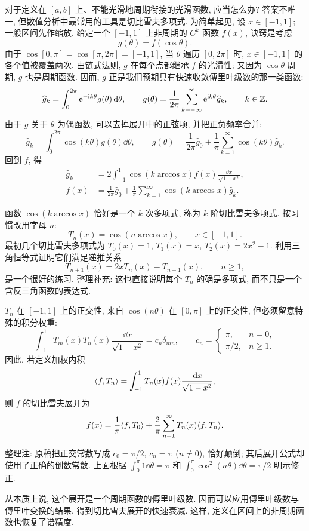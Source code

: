 对于定义在 $[a,b]$ 上、不能光滑地周期衔接的光滑函数, 应当怎么办? 答案不唯一, 但数值分析中最常用的工具是切比雪夫多项式. 为简单起见, 设 $x\in[-1,1]$; 一般区间先作缩放. 给定一个 $[-1,1]$ 上非周期的 $C^k$ 函数 $f(x)$, 诀窍是考虑
\[
g(\theta)=f(\cos\theta).
\]
由于 $\cos[0,\pi]=\cos[\pi,2\pi]=[-1,1]$, 当 $\theta$ 遍历 $[0,2\pi]$ 时, $x\in[-1,1]$ 的各个值被覆盖两次. 由链式法则, $g$ 在每个点都继承 $f$ 的光滑性; 又因为 $\cos\theta$ 周期, $g$ 也是周期函数. 因而, $g$ 正是我们预期具有快速收敛傅里叶级数的那一类函数:
\[
\widehat g_k=\int_0^{2\pi}\mathrm e^{-\mathrm i k\theta}g(\theta)\,\mathrm d\theta,
\qquad
g(\theta)=\frac1{2\pi}\sum_{k=-\infty}^{\infty}
\mathrm e^{\mathrm i k\theta}\widehat g_k,\qquad k\in\mathbb Z.
\]
由于 $g$ 关于 $\theta$ 为偶函数, 可以去掉展开中的正弦项, 并把正负频率合并:
\[
\widehat g_k=\int_0^{2\pi}\cos(k\theta)g(\theta)\dd\theta,
\qquad
g(\theta)=\frac1{2\pi}\widehat g_0
+\frac1\pi\sum_{k=1}^{\infty}\cos(k\theta)\widehat g_k.
\]
回到 $f$, 得
\begin{align*}
\widehat g_k&=2\int_{-1}^{1}\cos(k\arccos x)f(x)
\frac{\dd x}{\sqrt{1-x^2}},\\
f(x)&=\frac1{2\pi}\widehat g_0
+\frac1\pi\sum_{k=1}^{\infty}\cos(k\arccos x)\widehat g_k.
\end{align*}

函数 $\cos(k\arccos x)$ 恰好是一个 $k$ 次多项式, 称为 $k$ 阶切比雪夫多项式. 按习惯改用字母 $n$:
\[
T_n(x)=\cos(n\arccos x),\qquad x\in[-1,1].
\]
最初几个切比雪夫多项式为 $T_0(x)=1$, $T_1(x)=x$, $T_2(x)=2x^2-1$. 利用三角恒等式证明它们满足递推关系
\[
T_{n+1}(x)=2xT_n(x)-T_{n-1}(x),\qquad n\ge1,
\]
是一个很好的练习. 整理补充: 这也直接说明每个 $T_n$ 的确是多项式, 而不只是一个含反三角函数的表达式.

$T_n$ 在 $[-1,1]$ 上的正交性, 来自 $\cos(n\theta)$ 在 $[0,\pi]$ 上的正交性, 但必须留意特殊的积分权重:
\[
\int_{-1}^{1}T_m(x)T_n(x)\frac{\dd x}{\sqrt{1-x^2}}
=c_n\delta_{mn},\qquad
c_n=\begin{cases}\pi,&n=0,\\\pi/2,&n\ge1.\end{cases}
\]
因此, 若定义加权内积
\[
\langle f,T_n\rangle=\int_{-1}^{1}T_n(x)f(x)\frac{\,\mathrm d x}{\sqrt{1-x^2}},
\]
则 $f$ 的切比雪夫展开为
\[
f(x)=\frac1\pi\langle f,T_0\rangle
+\frac2\pi\sum_{n=1}^{\infty}T_n(x)\langle f,T_n\rangle.
\]
\begin{remark}
整理注: 原稿把正交常数写成 $c_0=\pi/2$, $c_n=\pi$ ($n\ne0$), 恰好颠倒; 其后展开公式却使用了正确的倒数常数. 上面根据 $\int_0^\pi1\dd\theta=\pi$ 和 $\int_0^\pi\cos^2(n\theta)\dd\theta=\pi/2$ 明示修正.
\end{remark}

从本质上说, 这个展开是一个周期函数的傅里叶级数. 因而可以应用傅里叶级数与傅里叶变换的结果, 得到切比雪夫展开的快速衰减. 这样, 定义在区间上的非周期函数也恢复了谱精度.
